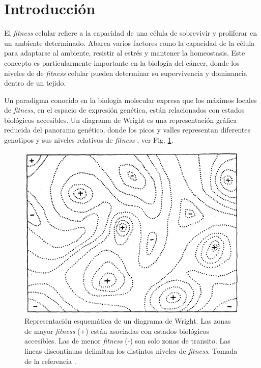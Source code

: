 \chapter*{Introducción} \label{intro}
\onehalfspacing

El \textit{fitness} celular refiere a la capacidad de una célula de sobrevivir y proliferar en un ambiente determinado. Abarca varios factores como la capacidad de la célula para adaptarse al ambiente, resistir al estrés y mantener la homeostasis. Este concepto es particularmente importante en la biología del cáncer, donde los niveles de de \textit{fitness} celular pueden determinar su supervivencia y dominancia dentro de un tejido.

Un paradigma conocido en la biología molecular expresa que los máximos locales de \textit{fitness}, en el espacio de expresión genética, están relacionados con estados biológicos accesibles. Un diagrama de Wright es una representación gráfica reducida del panorama genético, donde los picos y valles representan diferentes genotipos y sus niveles relativos de \textit{fitness} \cite{wright1932roles}, ver Fig. \ref{fig:wrightDiagram}. 

\begin{figure}[ht]
	\centering
	\includegraphics[scale=0.64]{figures/wright_diagram.png}
	\caption{Representación esquemática de un diagrama de Wright. Las zonas de mayor \textit{fitness} (+) están asociadas con estados biológicos accesibles. Las de menor \textit{fitness} (-) son solo zonas de transito. Las lineas discontinuas delimitan los distintos niveles de \textit{fitness}. Tomada de la referencia \cite{wright1932roles}.}
	\label{fig:wrightDiagram}
\end{figure}

